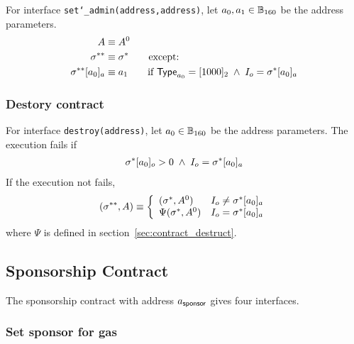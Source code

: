 For interface {\tt set\char`_admin(address,address)}, let $a_0,a_1\in \mathbb{B}_{160}$ be the address parameters. 
	\begin{align}
		A & \equiv A^0 \\
		\mathbf{\sigma}^{**} &\equiv \mathbf{\sigma}^* \qquad \mbox{except:}\\
		\mathbf{\sigma}^{**}[a_0]_a &\equiv
			a_1 \qquad \text{if } \mathsf{Type}_{a_0} = [1000]_2 \;\wedge\; I_o = \mathbf{\sigma}^*[a_0]_a 
    \end{align}
    
\subsubsection{Destory contract} 

For interface {\tt destroy(address)}, let $a_0\in \mathbb{B}_{160}$ be the address parameters. The execution fails if 
	\begin{align}
			\mathbf{\sigma}^*[a_0]_o>0\;\wedge\; 	I_o = \mathbf{\sigma}^*[a_0]_a
	\end{align}
	If the execution not fails, 
	\begin{align}
		(\mathbf{\sigma}^{**},A) \equiv \left\{\begin{array}{ll}
			(\mathbf{\sigma}^*,A^0) & I_o \neq \mathbf{\sigma}^*[a_0]_a \\
			\Psi(\mathbf{\sigma}^*,A^0) & I_o = \mathbf{\sigma}^*[a_0]_a
		\end{array}\right.
	\end{align}
	where $\Psi$ is defined in section~\ref{sec:contract_destruct}.

\subsection{Sponsorship Contract}
The sponsorship contract with address $a_{\sf sponsor}$ gives four interfaces.

\subsubsection{Set sponsor for gas}

